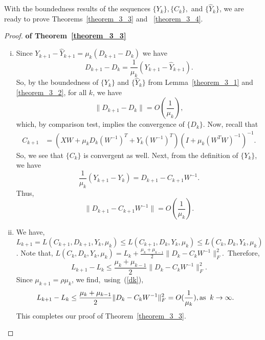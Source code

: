\documentclass[twoside,11pt]{article}
\begin{document}
With the boundedness results of the sequences $\{Y_k\},\{C_k\},$ and $\{\hat{Y}_k\}$, we are ready to prove Theorems~\ref{theorem_3_3} and ~\ref{theorem_3_4}.
\newpage
\begin{proof}{\bf of Theorem~\ref{theorem_3_3}} 
\begin{enumerate}[(i)]
	\item Since $Y_{k+1} - \hat{Y}_{k+1} = \mu_k(D_{k+1} - D_{k})$ we have
\begin{equation*}%
D_{k+1} - D_{k} = \frac{1}{\mu_k}(Y_{k+1} - \hat{Y}_{k+1}).
\end{equation*}
So, by the boundedness of $\{Y_k\}$ and $\{\hat{Y}_k\}$ from Lemma~\ref{theorem_3_1} and \ref{theorem_3_2}, for all $k$, we have
\begin{equation*}
\|D_{k+1} - D_{k}\|=O(\frac{1}{\mu_k}),
\end{equation*}
which, by comparison test, implies the convergence of $\{D_k\}$. Now, recall that
\begin{align*}C_{k+1} &= (XW +\mu_kD_k(W^{-1})^T+Y_k(W^{-1})^T)(I +\mu_k(W^TW)^{-1})^{-1}.\end{align*} So, we see that $\{C_k\}$ is convergent as well.
Next,  from the definition of $\{Y_k\}$, we have
\begin{equation*}\frac{1}{\mu_k}(Y_{k+1}-Y_k)=D_{k+1}-C_{k+1}W^{-1}.\end{equation*}
Thus,
\begin{equation}\label{dk}
\|D_{k+1}-C_{k+1}W^{-1}\|=O(\frac{1}{\mu_{k}}).
\end{equation}
\item 
We have, $L_{k+1}=L (C_{k+1},D_{k+1},Y_k,\mu_k) \le L (C_{k+1},D_{k},Y_k,\mu_k)\le L (C_{k},D_{k},Y_k,\mu_k)$. Note that, $L (C_{k},D_{k},Y_k,\mu_k)=L_k+ \frac{\mu_k+\mu_{k-1}}{2}\|D_k-C_kW^{-1}\|_F^2$.~Therefore,
\begin{equation*}L_{k+1}-L_k \le  \frac{\mu_k+\mu_{k-1}}{2}\|D_k-C_kW^{-1}\|_F^2.\end{equation*}
Since $\mu_{k+1}=\rho\mu_k$, we find,~using~(\ref{dk}),
\begin{align*}
L_{k+1}-L_k &\le \frac{\mu_k+\mu_{k-1}}{2}\|D_k-C_kW^{-1}\|_F^2 = O(\frac{1}{\mu_{k}}), {\rm as}\;\;k \rightarrow \infty.
\end{align*}
This completes our proof of Theorem~\ref{theorem_3_3}.
\end{enumerate}
\end{proof}
\end{document}
